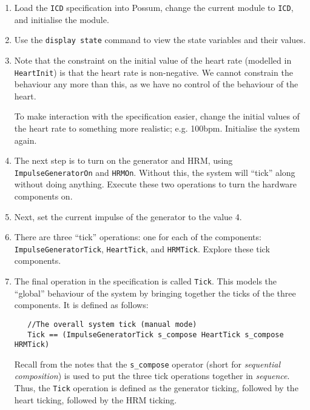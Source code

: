 \documentclass{article}
\begin{document}
\begin{enumerate}

 \item Load the \texttt{ICD} specification into Possum, change the current module to \texttt{ICD}, and initialise the module.

 \item Use the \texttt{display state} command to view the state variables and their values.

 \item Note that the constraint on the initial value of the heart rate (modelled in \texttt{HeartInit}) is that the heart rate is non-negative. We cannot constrain the behaviour any more than this, as we have no control of the behaviour of the heart.

To make interaction with the specification easier, change the initial values of the heart rate to something more realistic; e.g. 100bpm. Initialise the system again.

 \item The next step is to turn on the generator and HRM, using \texttt{ImpulseGeneratorOn} and \texttt{HRMOn}. Without this, the system will ``tick'' along without doing anything. Execute these two operations to turn the hardware components on.

 \item Next, set the current impulse of the generator to the value 4. 

 \item There are three ``tick'' operations: one for each of the components: \texttt{ImpulseGeneratorTick},  \texttt{HeartTick}, and \texttt{HRMTick}. Explore these tick components.

 \item The final operation in the specification is called \texttt{Tick}. This models the ``global'' behaviour of the system by bringing together the ticks of the three components. It is defined as follows:

\begin{lstlisting}
   //The overall system tick (manual mode)
   Tick == (ImpulseGeneratorTick s_compose HeartTick s_compose HRMTick)
\end{lstlisting}

Recall from the notes that the \texttt{s\_compose} operator (short for \emph{sequential composition}) is used to put the three tick operations together in \emph{sequence}. Thus, the \texttt{Tick} operation is defined as the generator ticking, followed by the heart ticking, followed by the HRM ticking.


\end{enumerate}
\end{document}
